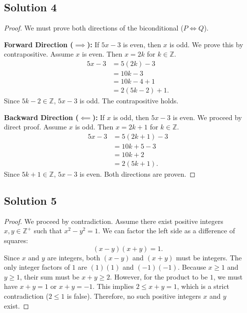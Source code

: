 \documentclass[11pt]{article}
\begin{document}
\subsection{Solution 4}
\begin{proof}
We must prove both directions of the biconditional ($P \iff Q$).

\textbf{Forward Direction ($\implies$):} If $5x - 3$ is even, then $x$ is odd.
We prove this by contrapositive. Assume $x$ is even. Then $x = 2k$ for $k \in \mathbb{Z}$.
\begin{align*}
5x - 3 &= 5(2k) - 3 \\
&= 10k - 3 \\
&= 10k - 4 + 1 \\
&= 2(5k - 2) + 1.
\end{align*}
Since $5k - 2 \in \mathbb{Z}$, $5x - 3$ is odd. The contrapositive holds.

\textbf{Backward Direction ($\impliedby$):} If $x$ is odd, then $5x - 3$ is even.
We proceed by direct proof. Assume $x$ is odd. Then $x = 2k + 1$ for $k \in \mathbb{Z}$.
\begin{align*}
5x - 3 &= 5(2k + 1) - 3 \\
&= 10k + 5 - 3 \\
&= 10k + 2 \\
&= 2(5k + 1).
\end{align*}
Since $5k + 1 \in \mathbb{Z}$, $5x - 3$ is even.
Both directions are proven.
\end{proof}

\subsection{Solution 5}
\begin{proof}
We proceed by contradiction. Assume there exist positive integers $x, y \in \mathbb{Z}^+$ such that $x^2 - y^2 = 1$.
We can factor the left side as a difference of squares:
\[ (x - y)(x + y) = 1. \]
Since $x$ and $y$ are integers, both $(x - y)$ and $(x + y)$ must be integers. The only integer factors of $1$ are $(1)(1)$ and $(-1)(-1)$. 
Because $x \ge 1$ and $y \ge 1$, their sum must be $x + y \ge 2$. 
However, for the product to be $1$, we must have $x + y = 1$ or $x + y = -1$. 
This implies $2 \le x + y = 1$, which is a strict contradiction ($2 \le 1$ is false). 
Therefore, no such positive integers $x$ and $y$ exist.
\end{proof}
\end{document}
